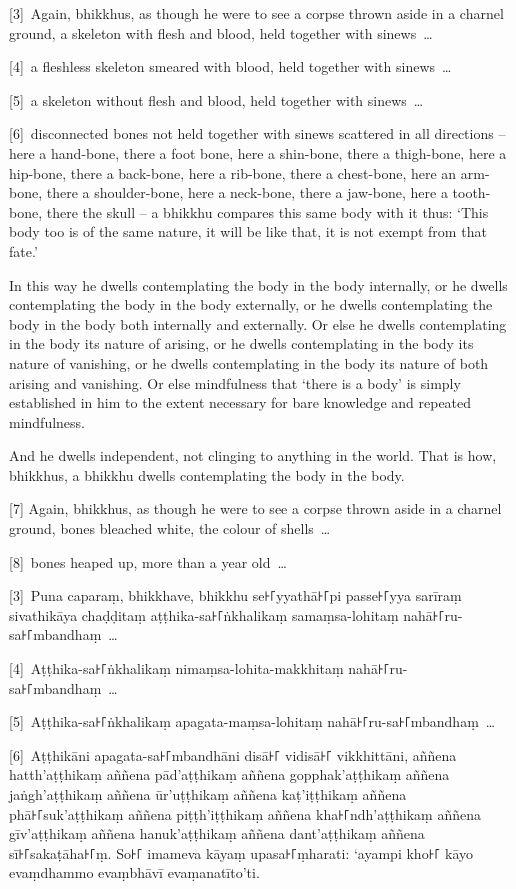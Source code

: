 \englishPage

[3]~Again, bhikkhus, as though he were to see a corpse thrown aside in a
charnel ground, a skeleton with flesh and blood, held together with sinews~\ldots{}

[4]~a fleshless skeleton smeared with blood, held together with sinews~\ldots{}

[5]~a skeleton without flesh and blood, held together with sinews~\ldots{}

[6]~disconnected bones not held together with sinews scattered in all directions
-- here a hand-bone, there a foot bone, here a shin-bone, there a thigh-bone,
here a hip-bone, there a back-bone, here a rib-bone, there a chest-bone, here an
arm-bone, there a shoulder-bone, here a neck-bone, there a jaw-bone, here a
tooth-bone, there the skull -- a bhikkhu compares this same body with it thus:
`This body too is of the same nature, it will be like that, it is not exempt
from that fate.'

In this way he dwells contemplating the body in the body internally, or he
dwells contemplating the body in the body externally, or he dwells contemplating
the body in the body both internally and externally. Or else he dwells
contemplating in the body its nature of arising, or he dwells contemplating in
the body its nature of vanishing, or he dwells contemplating in the body its
nature of both arising and vanishing. Or else mindfulness that ‘there is a body’
is simply established in him to the extent necessary for bare knowledge and
repeated mindfulness.

And he dwells independent, not clinging to anything in the world. That is how,
bhikkhus, a bhikkhu dwells contemplating the body in the body.

[7] Again, bhikkhus, as though he were to see a corpse thrown aside in a charnel
ground, bones bleached white, the colour of shells~\ldots{}

[8]~bones heaped up, more than a year old~\ldots{}

\paliPage

[3]~Puna caparaṃ, bhikkhave, bhikkhu se꜔꜒yyathā꜔꜒pi passe꜔꜒yya sarīraṃ sivathikāya
chaḍḍitaṃ aṭṭhika-sa꜔꜒ṅkhalikaṃ samaṃsa-lohitaṃ nahā꜔꜒ru-sa꜔꜒mbandhaṃ~\ldots{}

[4]~Aṭṭhika-sa꜔꜒ṅkhalikaṃ nimaṃsa-lohita-makkhitaṃ nahā꜔꜒ru-sa꜔꜒mbandhaṃ~\ldots{}

[5]~Aṭṭhika-sa꜔꜒ṅkhalikaṃ apagata-maṃsa-lohitaṃ nahā꜔꜒ru-sa꜔꜒mbandhaṃ~\ldots{}

[6]~Aṭṭhikāni apagata-sa꜔꜒mbandhāni disā꜔꜒ vidisā꜔꜒ vikkhittāni, aññena hatth'aṭṭhikaṃ
aññena pād'aṭṭhikaṃ aññena gopphak'aṭṭhikaṃ aññena jaṅgh'aṭṭhikaṃ aññena ūr'uṭṭhikaṃ
aññena kaṭ'iṭṭhikaṃ aññena phā꜔꜒suk'aṭṭhikaṃ aññena piṭṭh'iṭṭhikaṃ aññena
kha꜔꜒ndh'aṭṭhikaṃ aññena gīv'aṭṭhikaṃ aññena hanuk'aṭṭhikaṃ aññena dant'aṭṭhikaṃ
aññena sī꜔꜒sakaṭāha꜔꜒ṃ. So꜔꜒ imameva kāyaṃ upasa꜔꜒ṃharati: ‘ayampi kho꜔꜒ kāyo evaṃdhammo
evaṃbhāvī evaṃanatīto’ti.

